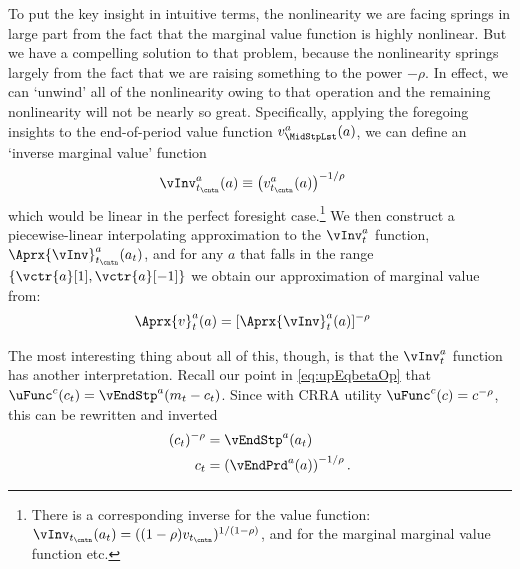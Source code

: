 \documentclass[titlepage, headings=optiontotocandhead]{Resources/texmf-local/tex/latex/econtex}
\begin{document}
To put the key insight in intuitive terms, the nonlinearity we are facing springs in large part from the fact that the marginal value function is highly nonlinear.  But we have a compelling solution to that problem, because the nonlinearity springs largely from the fact that we are raising something to the power $-\rho$.  In effect, we can `unwind' all of the nonlinearity owing to that operation and the remaining nonlinearity will not be nearly so great.  Specifically, applying the foregoing insights to the end-of-period value function $v^{a}_{\MidStpLst}(a)$, we can define an `inverse marginal value' function
\begin{equation}\begin{gathered}\begin{aligned}
      \vInv_{t_\cntn}^{a}(a)  & \equiv  \left(v^{a}_{t_\cntn}(a)\right)^{-1/\rho} \label{eq:cGoth}
    \end{aligned}\end{gathered}\end{equation}
which would be linear in the perfect foresight case.\footnote{There is a corresponding inverse for the value function: $\vInv_{t_\cntn}(a_{t})=((1-\rho)v_{t_\cntn})^{1/(1-\rho)}$, and for the marginal marginal value function etc.}  We then construct a piecewise-linear interpolating approximation to the $\vInv_{t}^{a}$ function, $\Aprx{\vInv}_{t_\cntn}^{a}(a_{t})$, and for any $a$ that falls in the range $\{\vctr{a}[1],\vctr{a}[-1]\}$ we obtain our approximation of marginal value from:
\begin{equation}\begin{gathered}\begin{aligned}
      \Aprx{v}_{t}^{a}(a) & =
      [\Aprx{\vInv}_{t}^{a}(a)]^{-\rho}
    \end{aligned}\end{gathered}\end{equation}

The most interesting thing about all of this, though, is that the $\vInv^{a}_{t}$ function has another interpretation. Recall our point in \eqref{eq:upEqbetaOp} that $\uFunc^{c}(c_{t}) = \vEndStp^{a}(m_{t}-c_{t})$.  Since with CRRA utility $\uFunc^{c}(c)=c^{-\rho}$, this can be rewritten
and inverted
\begin{equation}\begin{gathered}\begin{aligned}
      (c_{t})^{-\rho} & = \vEndStp^{a}(a_{t})
      \\ c_{t} & =      \left(\vEndPrd^{a}(a)\right)^{-1/\rho}.
    \end{aligned}\end{gathered}\end{equation}
\end{document}
